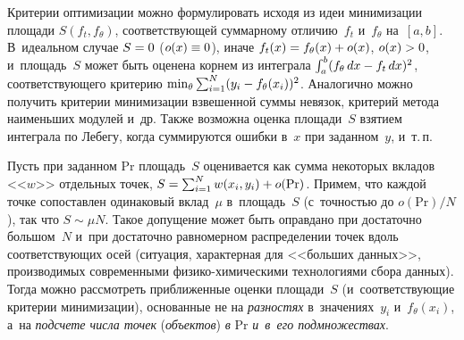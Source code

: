 \begin{multicols}{2}
    Критерии оптимизации можно формулировать исходя из идеи 
минимизации площади $S(f_t,f_\theta)$, соответствующей суммарному 
отличию~$f_t$ и~$f_\theta$ на~$[a,b]$. В~идеальном случае $S\hm=0$ 
($o(x)\hm\equiv 0$), иначе $f_t(x)\hm= f_\theta(x)\hm+ o(x)$, $o(x)\hm>0$, 
и~площадь~$S$ может быть оценена корнем из интеграла $\int\nolimits_a^b 
(f_\theta\,dx \hm- f_t\,dx)^2$, соответствующего критерию $\min\nolimits_\theta 
\sum\nolimits_{i=1}^N (y_i\hm- f_\theta(x_i))^2$. Аналогично можно получить 
критерии минимизации взвешенной суммы невязок, критерий метода 
наименьших модулей и~др. Также возможна оценка площади~$S$ взятием 
интеграла по Лебегу, когда суммируются ошибки в~$x$ при заданном~$y$, 
и~т.\,п.

    Пусть при заданном Pr площадь~$S$ оценивается как сумма некоторых 
вкладов <<$w$>> отдельных точек, $S\hm= \sum\nolimits^N_{i=1} w(x_i,y_i) 
\hm+ o(\mathrm{Pr})$. Примем, что каждой точке сопоставлен одинаковый 
вклад~$\mu$ в~площадь~$S$ (с~точ\-ностью до $o(\mathrm{Pr})/N$), так что 
$S\sim \mu N$. Такое допущение может быть оправдано при достаточно\linebreak 
большом~$N$ и~при достаточно равномерном распределении точек вдоль 
соответствующих осей (ситуация, характерная для <<больших данных>>, 
производимых современными фи\-зи\-ко-хи\-ми\-че\-ски\-ми \mbox{технологиями} 
сбора данных). Тогда можно рас\-смот\-реть приближенные оценки площади~$S$ 
(и~соответствующие критерии минимизации), основанные не на 
\textit{разностях} в~значениях~$y_i$ и~$f_\theta(x_i)$, а~на \textit{подсчете 
числа точек} (\textit{объектов}) \textit{в} Pr \textit{и~в~его подмножествах}.


\end{multicols}
